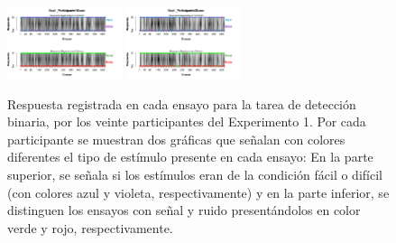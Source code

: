 \begin{figure}[th]
\includegraphics[width=0.30\textwidth]{Figures/BiasResp_Exp1_P19} \includegraphics[width=0.30\textwidth]{Figures/BiasResp_Exp1_P20} 
\caption[Respuesta binaria registrada ensayo a ensayo en relación con el tipo de estímulo a evaluar; Experimento 1]{Respuesta registrada en cada ensayo para la tarea de detección binaria, por los veinte participantes del Experimento 1. Por cada participante se muestran dos gráficas que señalan con colores diferentes el tipo de estímulo presente en cada ensayo: En la parte superior, se señala si los estímulos eran de la condición fácil o difícil (con colores azul y violeta, respectivamente) y en la parte inferior, se distinguen los ensayos con señal y ruido presentándolos en color verde y rojo, respectivamente.}
\label{fig:BiasResp_E1}
\end{figure}

